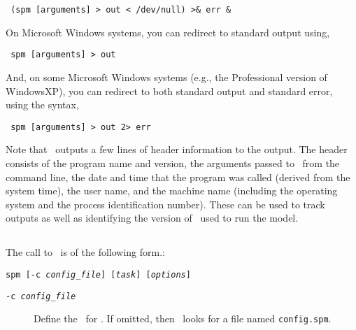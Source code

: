\begin{verbatim} (spm [arguments] > out < /dev/null) >& err &\end{verbatim}

On Microsoft Windows systems, you can redirect to standard output using,

\begin{verbatim} spm [arguments] > out\end{verbatim}

And, on some Microsoft Windows systems (e.g., the Professional version of WindowsXP), you can redirect to both standard output and standard error, using the syntax, 

\begin{verbatim} spm [arguments] > out 2> err\end{verbatim}

Note that \SPM\ outputs a few lines of header information to the output. The header consists of the program name and version, the arguments passed to \SPM\ from the command line, the date and time that the program was called (derived from the system time), the user name, and the machine name (including the operating system and the process identification number). These can be used to track outputs as well as identifying the version of \SPM\ used to run the model.

\subsection{\label{sec:command-line-arguments}}

The call to \SPM\ is of the following form.: 

\texttt{spm [-c \emph{config\_file}] [\emph{task}] [\emph{options}]}

\begin{description}
  \item [\texttt{-c \emph{config\_file}}] Define the \config\ for \SPM. If omitted, then \SPM\ looks for a file named \texttt{config.spm}.
\end{description}

